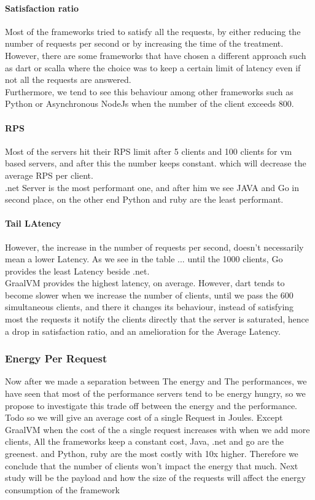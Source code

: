 \paragraph{Satisfaction ratio}
Most of the frameworks tried to satisfy all the requests, by either reducing the number of requests per second or by increasing the time of the treatment. However, there are some frameworks that have chosen a different approach such as dart or scalla where the choice was to keep a certain limit of latency even if not all the requests are answered.\\
Furthermore, we tend to see this behaviour among other frameworks such as Python or Asynchronous NodeJs when the number of the client exceeds 800.
\paragraph{RPS}
Most of the servers hit their RPS limit after 5 clients and 100 clients for vm based servers, and after this the number keeps constant. which will decrease the average RPS per client.\\
.net Server is the most performant one, and after him we see JAVA and Go in second place, on the other end Python and ruby are the least performant.
\paragraph{Tail LAtency}
However, the increase in the number of requests per second, doesn't necessarily mean a lower Latency.
As we see in the table ... until the 1000 clients, Go provides the least Latency beside .net.\\
GraalVM provides the highest latency, on average. However, dart tends to become slower when we increase the number of clients, until we pass the 600 simultaneous clients, and there it changes its behaviour, instead of satisfying most the requests it notify the clients directly that the server is saturated, hence a drop in satisfaction ratio, and an amelioration for the Average Latency.


\subsubsection{Energy Per Request}
Now after we made a separation between The energy and The performances, we have seen that most of the performance servers tend to be energy hungry, so we propose to investigate this trade off between the energy and the performance. Todo so we will give an average cost of a single Request in Joules.
Except GraalVM when the cost of the a single request increases with when we add more clients, All the frameworks keep a constant cost,
Java, .net and go are the greenest. and Python, ruby are the most costly with 10x higher.
Therefore we conclude that the number of clients won't impact the energy that much.
Next study will be the payload and how the size of the requests will affect the energy consumption of the framework


